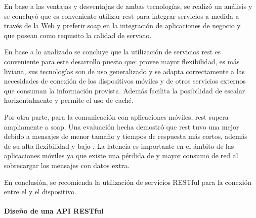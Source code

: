 En base a las ventajas y desventajas de ambas tecnologías, se realizó un análisis\cite[p.~809]{pautasso2008restful} y se concluyó que es conveniente utilizar \gls{rest} para integrar servicios a medida a través de la Web y preferir \gls{soap} en la integración de aplicaciones de negocio y que posean como requisito la calidad de servicio.

En base a lo analizado se concluye que la utilización de servicios \gls{rest} es conveniente para este desarrollo puesto que: provee mayor flexibilidad, es más liviana, sus tecnologías son de uso generalizado y se adapta correctamente a las necesidades de conexión de los dispositivos móviles y de otros servicios externos que consuman la información provista. Además facilita la posibilidad de escalar horizontalmente y permite el uso de caché.

Por otra parte, para la comunicación con aplicaciones móviles, \gls{rest} supera ampliamente a \gls{soap}. Una evaluación hecha\cite{hamad2010performance} demostró que \gls{rest} tuvo una mejor  debido a mensajes de menor tamaño y tiempos de respuesta más cortos, además de su alta flexibilidad y bajo . La latencia es importante en el ámbito de las aplicaciones móviles ya que existe una pérdida de  y mayor consumo de red al sobrecargar los mensajes con datos extra.



En conclusión, se recomienda la utilización de servicios RESTful\cite{hamad2010performance} para la conexión entre el  y el dispositivo.

\paragraph{Diseño de una API RESTful}
\label{caracteristicas_api_restful}

